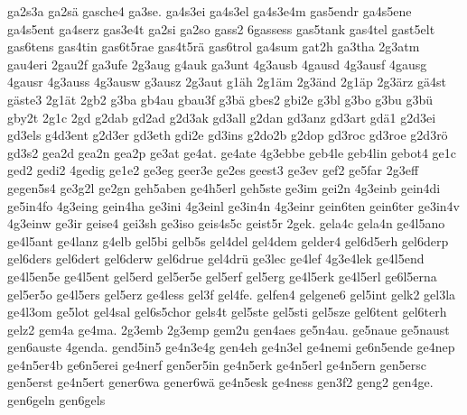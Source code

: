 {    ga2s3a
    ga2sä
    gasche4
    ga3se.
    ga4s3ei
    ga4s3el
    ga4s3e4m
    gas5endr
    ga4s5ene
    ga4s5ent
    ga4serz
    gas3e4t
    ga2si
    ga2so
    gass2
    6gassess
    gas5tank
    gas4tel
    gast5elt
    gas6tens
    gas4tin
    gas6t5rae
    gas4t5rä
    gas6trol
    ga4sum
    gat2h
    ga3tha
    2g3atm
    gau4eri
    2gau2f
    ga3ufe
    2g3aug
    g4auk
    ga3unt
    4g3ausb
    4gausd
    4g3ausf
    4gausg
    4gausr
    4g3auss
    4g3ausw
    g3ausz
    2g3aut
    g1äh
    2g1äm
    2g3änd
    2g1äp
    2g3ärz
    gä4st
    gäste3
    2g1ät
    2gb2
    g3ba
    gb4au
    gbau3f
    g3bä
    gbes2
    gbi2e
    g3bl
    g3bo
    g3bu
    g3bü
    gby2t
    2g1c
    2gd
    g2dab
    gd2ad
    g2d3ak
    gd3all
    g2dan
    gd3anz
    gd3art
    gdä1
    g2d3ei
    gd3els
    g4d3ent
    g2d3er
    gd3eth
    gdi2e
    gd3ins
    g2do2b
    g2dop
    gd3roc
    gd3roe
    g2d3rö
    gd3s2
    gea2d
    gea2n
    gea2p
    ge3at
    ge4at.
    ge4ate
    4g3ebbe
    geb4le
    geb4lin
    gebot4
    ge1c
    ged2
    gedi2
    4gedig
    ge1e2
    ge3eg
    geer3e
    ge2es
    geest3
    ge3ev
    gef2
    ge5far
    2g3eff
    gegen5s4
    ge3g2l
    ge2gn
    geh5aben
    ge4h5erl
    geh5ste
    ge3im
    gei2n
    4g3einb
    gein4di
    ge5in4fo
    4g3eing
    gein4ha
    ge3ini
    4g3einl
    ge3in4n
    4g3einr
    gein6ten
    gein6ter
    ge3in4v
    4g3einw
    ge3ir
    geise4
    gei3sh
    ge3iso
    geis4s5c
    geist5r
    2gek.
    gela4c
    gela4n
    ge4l5ano
    ge4l5ant
    ge4lanz
    g4elb
    gel5bi
    gelb5s
    gel4del
    gel4dem
    gelder4
    gel6d5erh
    gel6derp
    gel6ders
    gel6dert
    gel6derw
    gel6drue
    gel4drü
    ge3lec
    ge4lef
    4g3e4lek
    ge4l5end
    ge4l5en5e
    ge4l5ent
    gel5erd
    gel5er5e
    gel5erf
    gel5erg
    ge4l5erk
    ge4l5erl
    ge6l5erna
    gel5er5o
    ge4l5ers
    gel5erz
    ge4less
    gel3f
    gel4fe.
    gelfen4
    gelgene6
    gel5int
    gelk2
    gel3la
    ge4l3om
    ge5lot
    gel4sal
    gel6s5chor
    gels4t
    gel5ste
    gel5sti
    gel5sze
    gel6tent
    gel6terh
    gelz2
    gem4a
    ge4ma.
    2g3emb
    2g3emp
    gem2u
    gen4aes
    ge5n4au.
    ge5naue
    ge5naust
    gen6auste
    4genda.
    gend5in5
    ge4n3e4g
    gen4eh
    ge4n3el
    ge4nemi
    ge6n5ende
    ge4nep
    ge4n5er4b
    ge6n5erei
    ge4nerf
    gen5er5in
    ge4n5erk
    ge4n5erl
    ge4n5ern
    gen5ersc
    gen5erst
    ge4n5ert
    gener6wa
    gener6wä
    ge4n5esk
    ge4ness
    gen3f2
    geng2
    gen4ge.
    gen6geln
    gen6gels
}
